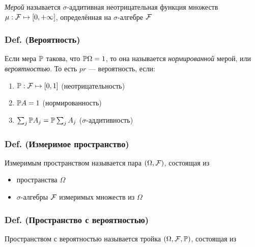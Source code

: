 \emph{Мерой} называется \(\sigma\)-аддитивная неотрицательная функция
множеств \hbox{$\mu : \mathcal F\mapsto [0,+\infty]$}, определённая на
\(\sigma\)-алгебре \(\mathcal F\)

\subsubsection{Def.
(Вероятность)}\label{def.-ux432ux435ux440ux43eux44fux442ux43dux43eux441ux442ux44c}

Если мера \(\mathbb P\) такова, что \(\mathbb P\Omega = 1\), то она называется
\emph{нормированной} мерой, или \emph{вероятностью}. То есть \(pr\) ---
вероятность, если:

\begin{enumerate}
\def\labelenumi{\arabic{enumi}.}

\item
  \(\mathbb P : \mathcal F\mapsto [0,1]\) (неотрицательность)
\item
  \(\mathbb P A = 1\) (нормированность)
\item
  \(\sum_j \mathbb P A_j = \mathbb P \sum_j A_j\) (\(\sigma\)-аддитивность)
\end{enumerate}

\subsubsection{Def. (Измеримое
пространство)}\label{def.-ux438ux437ux43cux435ux440ux438ux43cux43eux435-ux43fux440ux43eux441ux442ux440ux430ux43dux441ux442ux432ux43e}

Измеримым пространством называется пара \((\Omega, \mathcal F)\),
состоящая из

\begin{itemize}

\item
  пространства \(\Omega\)
\item
  \(\sigma\)-алгебры \(\mathcal F\) измеримых множеств из \(\Omega\)
\end{itemize}

\subsubsection{Def. (Пространство с
вероятностью)}\label{def.-ux43fux440ux43eux441ux442ux440ux430ux43dux441ux442ux432ux43e-ux441-ux432ux435ux440ux43eux44fux442ux43dux43eux441ux442ux44cux44e}

Пространством с вероятностью называется тройка
\((\Omega, \mathcal F, \mathbb P)\), состоящая из

